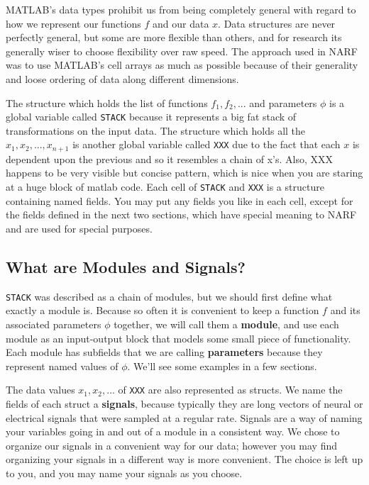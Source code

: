 \documentclass[letterpaper]{report}
\newcommand{\definition}[1]{\textbf{#1}}
\newcommand{\matlab}[1]{\texttt{#1}}
\begin{document}
MATLAB's data types prohibit us from being completely general with regard to how we represent our functions $f$ and our data $x$. Data structures are never perfectly general, but some are more flexible than others, and for research its generally wiser to choose flexibility over raw speed. The approach used in NARF was to use MATLAB's cell arrays as much as possible because of their generality and loose ordering of data along different dimensions. 

The structure which holds the list of functions $f_1, f_2, ...$ and parameters $\phi$ is a global variable called \matlab{STACK} because it represents a big fat stack of transformations on the input data. The structure which holds all the $x_1, x_2, ..., x_{n+1}$ is another global variable called \matlab{XXX} due to the fact that each $x$ is dependent upon the previous and so it resembles a chain of x's. Also, XXX happens to be very visible but concise pattern, which is nice when you are staring at a huge block of matlab code. Each cell of \matlab{STACK} and \matlab{XXX} is a structure containing named fields. You may put any fields you like in each cell, except for the fields defined in the next two sections, which have special meaning to NARF and are used for special purposes. 

\subsection{What are Modules and Signals?}

\matlab{STACK} was described as a chain of modules, but we should first define what exactly a module is. Because so often it is convenient to keep a function $f$ and its associated parameters $\phi$ together, we will call them a \definition{module}, and use each module as an input-output block that models some small piece of functionality. Each module has subfields that we are calling \definition{parameters} because they represent named values of $\phi$. We'll see some examples in a few sections. 

The data values $x_1, x_2, ...$ of \matlab{XXX} are also represented as structs. We name the fields of each struct a \definition{signals}, because typically they are long vectors of neural or electrical signals that were sampled at a regular rate. Signals are a way of naming your variables going in and out of a module in a consistent way. We chose to organize our signals in a convenient way for our data; however you may find organizing your signals in a different way is more convenient. The choice is left up to you, and you may name your signals as you choose. 
\end{document}
